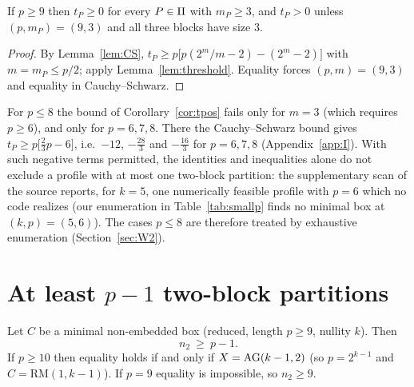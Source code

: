 \begin{corollary}\label{cor:tpos}
If $p\ge9$ then $t_P\ge0$ for every $P\in\Pi$ with $m_P\ge3$, and $t_P>0$ unless $(p,m_P)=(9,3)$ and all three blocks have size $3$.
\end{corollary}

\begin{proof}
By Lemma~\ref{lem:CS}, $t_P\ge p\bigl[p(2^m/m-2)-(2^m-2)\bigr]$ with $m=m_P\le p/2$; apply Lemma~\ref{lem:threshold}. Equality forces $(p,m)=(9,3)$ and equality in Cauchy--Schwarz.
\end{proof}

\begin{remark}\label{rem:exceptional}
For $p\le8$ the bound of Corollary~\ref{cor:tpos} fails only for $m=3$ (which requires $p\ge6$), and only for $p=6,7,8$. There the Cauchy--Schwarz bound gives $t_P\ge p\bigl[\tfrac23p-6\bigr]$, i.e.\ $-12$, $-\tfrac{28}{3}$ and $-\tfrac{16}{3}$ for $p=6,7,8$ (Appendix~\ref{app:I}). With such negative terms permitted, the identities and inequalities alone do not exclude a profile with at most one two-block partition: the supplementary scan  of the source reports, for $k=5$, one numerically feasible profile with $p=6$ which no code realizes (our enumeration in Table~\ref{tab:smallp} finds no minimal box at $(k,p)=(5,6)$). The cases $p\le8$ are therefore treated by exhaustive enumeration (Section~\ref{sec:W2}).
\end{remark}

\section{At least \texorpdfstring{$p-1$}{p-1} two-block partitions}\label{sec:n2}

\begin{theorem}[$n_2\ge p-1$; \gid{G11-L6}]\label{thm:L6}
Let $C$ be a minimal non-embedded box (reduced, length $p\ge9$, nullity $k$). Then
\[
n_2\ \ge\ p-1 .
\]
If $p\ge10$ then equality holds if and only if $X=\mathrm{AG}(k-1,2)$ (so $p=2^{k-1}$ and $C=\mathrm{RM}(1,k-1)$). If $p=9$ equality is impossible, so $n_2\ge9$.
\end{theorem}

